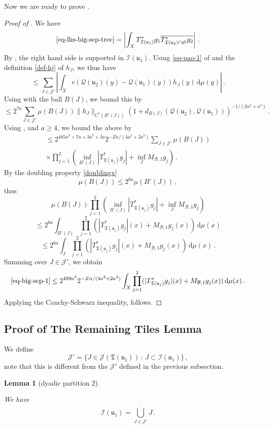 \documentclass[10pt,a4paper]{article}
\theoremstyle{plain}
\newtheorem{lemma}[theorem]{Lemma}
\theoremstyle{definition}
\numberwithin{equation}{subsection}
\newcommand{\fu}{{\mathfrak u}}
\newcommand{\fT}{{\mathfrak T}}
\newcommand{\scI}{{\mathcal{I}}} %
\newcommand{\fcc}{{\mathcal{Q}}}
\newcommand{\lean}[1]{}
\newcommand{\proves}[1]{}
\newcommand{\uses}[1]{}
\newcommand{\leanok}{}
\begin{document}
    Now we are ready to prove .
    \begin{proof}[Proof of ]
    \leanok
    \proves{correlation-distant-tree-parts}
    We have
    $$
        \eqref{eq-lhs-big-sep-tree} = \left| \int_{X} T_{\fT(\fu_1)}^* g_1 \overline{T_{\fT(\fu_2) \cap \mathfrak{S}}^* g_2 }\right|\,.
    $$
    By , the right hand side is supported in $\scI(\fu_1)$. Using \eqref{eq-pao-1} of  and the definition \eqref{def-hj} of $h_J$, we thus have
    $$
        \le \sum_{J \in \mathcal{J}'} \left|\int_{X} e(\fcc(\fu_2)(y) - \fcc(\fu_1)(y)) h_J(y) \, \mathrm{d}\mu(y) \right|\,.
    $$
    Using  with the ball $B(J)$, we bound this by
    $$
        \le 2^{7a} \sum_{J \in \mathcal{J}'} \mu(B(J)) \|h_J\|_{C^{\tau}(B'(J))} (1 + d_{B(J)}(\fcc(\fu_2), \fcc(\fu_1)))^{-1/(2a^2+a^3)}\,.
    $$
    Using ,  and $a \ge 4$, we bound the above by
    \begin{multline}
        \label{eq-big-sep-1}
        \le 2^{485a^3+7a+3a^3+3a} 2^{-Zn/(4a^2 + 2a^3)} \sum_{J \in \mathcal{J}'} \mu(B(J)) \\
        \times \prod_{j=1}^2 (\inf_{B^\circ{}(J)} |T_{\fT(\fu_j)}^* g_j| + \inf_J M_{\mathcal{B},1} g_j)\,.
    \end{multline}
    By the doubling property \eqref{doublingx}
    $$
        \mu(B(J)) \le 2^{6a} \mu(B^\circ{}(J))\,,
    $$
    thus
    $$
        \mu(B(J)) \prod_{j=1}^2 (\inf_{B^\circ{}(J)} |T_{\fT(\fu_j)}^* g_j| + \inf_J M_{\mathcal{B},1} g_j)
    $$
    $$
        \le 2^{6a} \int_{B^\circ{}(J)} \prod_{j=1}^2 ( |T_{\fT(\fu_j)}^* g_j|(x) + M_{\mathcal{B},1} g_j(x)) \, \mathrm{d}\mu(x)
    $$
    $$
        \le 2^{6a} \int_J \prod_{j=1}^2 ( |T_{\fT(\fu_j)}^* g_j|(x) + M_{\mathcal{B},1} g_j(x)) \, \mathrm{d}\mu(x)\,.
    $$
    Summing over $J \in \mathcal{J}'$, we obtain
    $$
        \eqref{eq-big-sep-1} \le 2^{499a^3} 2^{-Zn/(4a^2 + 2a^3)} \int_X \prod_{j=1}^2 ( |T_{\fT(\fu_j)}^* g_j|(x) + M_{\mathcal{B},1} g_j(x)) \, \mathrm{d}\mu(x)\,.
    $$
    Applying the Cauchy-Schwarz inequality,  follows.
    \end{proof}

\subsection{Proof of The Remaining Tiles Lemma}
    \label{subsec-rest-tiles}
    We define
    $$
        \mathcal{J}' = \{J \in \mathcal{J}(\fT(\fu_1)) \, : \, J \subset \scI(\fu_1)\}\,,
    $$
    note that this is different from the $\mathcal{J}'$ defined in the previous subsection.
    \begin{lemma}[dyadic partition 2]
        \label{dyadic-partition-2}
        \leanok
        \lean{TileStructure.Forest.union_𝓙₆, TileStructure.Forest.pairwiseDisjoint_𝓙₆}
        \uses{dyadic-partitions}
        We have
        $$
            \scI(\fu_1) = \dot{\bigcup_{J \in \mathcal{J}'}} J\,.
        $$
    \end{lemma}
\end{document}
